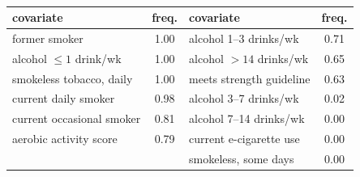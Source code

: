 	\begin{table}[!htbp]
	\centering
	\small
	\caption{}
	\label{tab:brfss}
	\begin{tabular}{lc@{\qquad}lc}
	\hline
	covariate & freq. & covariate & freq.\\
	\hline
	former smoker            & 1.00 & alcohol 1--3 drinks/wk   & 0.71\\
	alcohol $\le 1$ drink/wk & 1.00 & alcohol $>14$ drinks/wk  & 0.65\\
	smokeless tobacco, daily & 1.00 & meets strength guideline & 0.63\\
	current daily smoker     & 0.98 & alcohol 3--7 drinks/wk   & 0.02\\
	current occasional smoker& 0.81 & alcohol 7--14 drinks/wk  & 0.00\\
	aerobic activity score   & 0.79 & current e-cigarette use  & 0.00\\
	                         &      & smokeless, some days     & 0.00\\
	\hline
	\end{tabular}
	\end{table}
